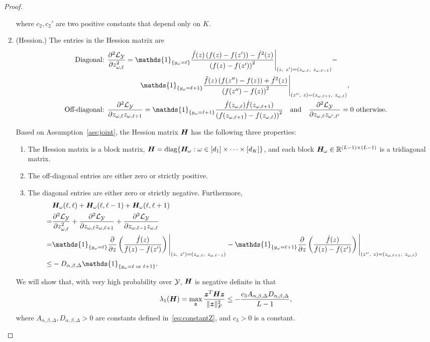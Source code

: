 \documentclass{article}
\theoremstyle{plain}
\theoremstyle{definition}
\begin{document}
\begin{proof}
\begin{enumerate}
where $c_2,c_2'$ are two positive constants that depend only on $K$.
\item (Hession.) The entries in the Hession matrix are
\begin{align}
\text{Diagonal: }&{\partial^2 \tL_\tY\over \partial z^2_{\omega,\ell}}=\mathds{1}_{\{y_\omega=\ell\}}{\ddot{f}(z)\left(f(z)-f(z')\right)-\dot{f}^2(z)\over \left(f(z)-f(z')\right)^2}\Bigg|_{(z,\ z')=(z_{\omega,\ell},\ z_{\omega,\ell-1})}-\\
&\hspace{.65in}\mathds{1}_{\{y_\omega=\ell+1\}}{\ddot{f}(z)\left(f(z'')-f(z)\right)+\dot{f}^2(z)\over \left(f(z'')-f(z)\right)^2}\Bigg|_{(z'',\ z)=(z_{\omega,\ell+1},\ z_{\omega,\ell})},\\
\text{Off-diagonal: }&
{\partial^2 \tL_\tY\over \partial z_{\omega,\ell}z_{\omega,\ell+1}}=\mathds{1}_{\{y_\omega=\ell+1\}}{\dot{f}(z_{\omega,\ell})\dot{f}(z_{\omega,\ell+1})\over \left(f(z_{\omega,\ell+1})-f(z_{\omega,\ell})\right)^2}\quad \text{and}\quad {\partial^2 \tL_\tY\over \partial z_{\omega,\ell}z_{\omega',\ell'}}=0 \text{ otherwise}. 
\end{align}

Based on Assumption~\ref{ass:joint}, the Hession matrix $\bm{H}$ has the following three properties:
\begin{enumerate}
\item The Hession matrix is a block matrix, $\bm{H}=\text{diag}\{\bm{H}_\omega: \omega\in[d_1]\times \cdots \times [d_K]\}$, and each block $\bm{H}_{\omega}\in\mathbb{R}^{(L-1)\times (L-1)}$ is a tridiagonal matrix. 
\item The off-diagonal entries are either zero or strictly positive.
\item The diagonal entries are either zero or strictly negative. Furthermore, 
\begin{align}
&\mH_\omega(\ell,\ell)+ \mH_\omega(\ell,\ell-1)+\mH_\omega(\ell,\ell+1)\\
=&{\partial^2 \tL_\tY\over \partial z^2_{\omega,\ell}}+{\partial^2 \tL_\tY\over \partial z_{\omega,\ell}z_{\omega,\ell+1}}+{\partial^2 \tL_\tY\over \partial z_{\omega,\ell-1}z_{\omega,\ell}}\\
=&\mathds{1}_{\{y_\omega=\ell\}}{\partial\over \partial z}\left({\dot{f}(z) \over f(z)-f(z')}\right)\Bigg|_{(z,\ z')=(z_{\omega,\ell},\ z_{\omega,\ell-1})}  -\mathds{1}_{\{y_\omega=\ell+1\}}{\partial\over \partial z}\left({\dot{f}(z) \over f(z)-f(z')}\right)\Bigg|_{(z'',\ z)=(z_{\omega,\ell+1},\ z_{\omega,\ell})}\\
\leq &-D_{\alpha,\beta,\Delta}\mathds{1}_{\{y_\omega = \ell \text{ or } \ell+1\}}.
\end{align}
\end{enumerate}
We will show that, with very high probability over $\mathcal{Y}$, $\bm{H}$ is negative definite in that
\begin{equation}\label{eq:HessionZ}
\lambda_{1}(\bm{H})=\max_{\bm{z}}{\bm{z}^T\bm{H}\bm{z}\over\lVert\bm{z}\rVert_F^2} \leq -{c_3A_{\alpha,\beta,\Delta}D_{\alpha,\beta,\Delta}\over L-1},
\end{equation}
where $A_{\alpha,\beta,\Delta}, D_{\alpha,\beta,\Delta}>0$ are constants defined in~\eqref{eq:constantZ}, and $c_3>0$ is a constant. 


\end{enumerate}
\end{proof}
\end{document}
